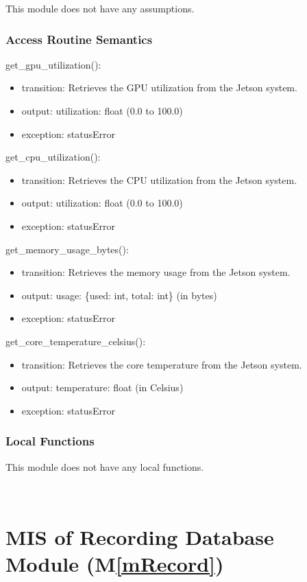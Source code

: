\documentclass[12pt, titlepage]{article}
\newcommand{\mref}[1]{M\ref{#1}}
\begin{document}
This module does not have any assumptions.

\subsubsection{Access Routine Semantics}

\noindent get\_gpu\_utilization():
\begin{itemize}
  \item transition: Retrieves the GPU utilization from the Jetson system.
  \item output: utilization: float (0.0 to 100.0)
  \item exception: statusError
\end{itemize}

\noindent get\_cpu\_utilization():
\begin{itemize}
  \item transition: Retrieves the CPU utilization from the Jetson system.
  \item output: utilization: float (0.0 to 100.0)
  \item exception: statusError
\end{itemize}

\noindent get\_memory\_usage\_bytes():
\begin{itemize}
  \item transition: Retrieves the memory usage from the Jetson system.
  \item output: usage: \{used: int, total: int\} (in bytes)
  \item exception: statusError
\end{itemize}

\noindent get\_core\_temperature\_celsius():
\begin{itemize}
  \item transition: Retrieves the core temperature from the Jetson system.
  \item output: temperature: float (in Celsius)
  \item exception: statusError
\end{itemize}

\subsubsection{Local Functions}

This module does not have any local functions.

\ \

\section{MIS of Recording Database Module (\mref{mRecord})}
\end{document}
